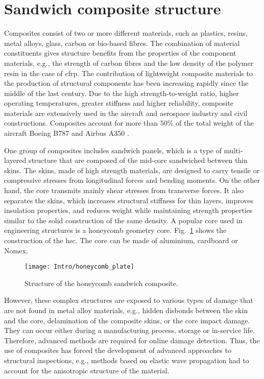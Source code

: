 \section{Sandwich composite structure}
\label{sec:scs}

Composites consist of two or more different materials, such as plastics, resins, metal alloys, glass, carbon or bio-based fibres. The combination of material constituents gives  structure benefits from the properties of the component materials, e.g., the strength of carbon fibres and the low density of the polymer resin in the case of \ac{cfrp}.
The contribution of lightweight composite materials to the production of structural components has been increasing rapidly since the middle of the last century.
Due to the high strength-to-weight ratio, higher operating temperatures, greater stiffness and higher
reliability, composite materials are extensively used in the aircraft and aerospace industry and civil constructions.
Composites account for more than 50\% of the total weight of the aircraft Boeing B787 and Airbus A350 \cite{giurgiutiu2015structural}.

One group of composites includes sandwich panels, which is a type of multi-layered structure that are composed of the mid-core sandwiched between thin skins.
The skins, made of high strength materials, are designed to carry tensile or compressive stresses from longitudinal forces and bending moments.
On the other hand, the core transmits mainly shear stresses from transverse forces.
It also separates the skins, which increases structural stiffness for thin layers, improves insulation properties, and reduces weight while maintaining strength properties similar to the solid construction of the same density.
A popular core used in engineering structures is a honeycomb geometry core.
Fig.~\ref{fig:hcp} shows the construction of the \ac{hsc}.
The core can be made of aluminium, cardboard or Nomex. 
\begin{figure}[H] %
	\begin{center}
		\texttt{[image: Intro/honeycomb\_plate]}
		\caption{
			\label{fig:hcp} Structure of the honeycomb sandwich composite.}
		\vspace{-0.5cm}
	\end{center}
\end{figure}

However, these complex structures are exposed to various types of damage that are not found in metal alloy materials, e.g., hidden disbonds between the skin and the core, delamination of the composite skins, or the core impact damage.
They can occur either during a manufacturing process, storage or in-service life.
Therefore, advanced methods are required for online damage detection.
Thus, the use of composites has forced the development of advanced approaches to structural inspections, e.g., methods based on elastic wave propagation had to account for the anisotropic structure of the material.